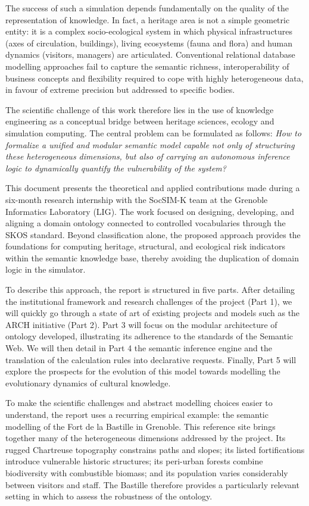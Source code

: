 \documentclass{article}
\begin{document}
The success of such a simulation depends fundamentally on the quality of the representation of knowledge. In fact, a heritage area is not a simple geometric entity: it is a complex socio-ecological system in which physical infrastructures (axes of circulation, buildings), living ecosystems (fauna and flora) and human dynamics (visitors, managers) are articulated. Conventional relational database modelling approaches fail to capture the semantic richness, interoperability of business concepts and flexibility required to cope with highly heterogeneous data, in favour of extreme precision but addressed to specific bodies.

The scientific challenge of this work therefore lies in the use of knowledge engineering as a conceptual bridge between heritage sciences, ecology and simulation computing. The central problem can be formulated as follows: \textit{How to formalize a unified and modular semantic model capable not only of structuring these heterogeneous dimensions, but also of carrying an autonomous inference logic to dynamically quantify the vulnerability of the system? }

This document presents the theoretical and applied contributions made during a six-month research internship with the SocSIM-K team at the Grenoble Informatics Laboratory (LIG). The work focused on designing, developing, and aligning a domain ontology connected to controlled vocabularies through the SKOS standard. Beyond classification alone, the proposed approach provides the foundations for computing heritage, structural, and ecological risk indicators within the semantic knowledge base, thereby avoiding the duplication of domain logic in the simulator.

To describe this approach, the report is structured in five parts. After detailing the institutional framework and research challenges of the project (Part 1), we will quickly go through a state of art of existing projects and models such as the ARCH initiative (Part 2). Part 3 will focus on the modular architecture of ontology developed, illustrating its adherence to the standards of the Semantic Web. We will then detail in Part 4 the semantic inference engine and the translation of the calculation rules into declarative requests. Finally, Part 5 will explore the prospects for the evolution of this model towards modelling the evolutionary dynamics of cultural knowledge.

To make the scientific challenges and abstract modelling choices easier to understand, the report uses a recurring empirical example: the semantic modelling of the Fort de la Bastille in Grenoble. This reference site brings together many of the heterogeneous dimensions addressed by the project. Its rugged Chartreuse topography constrains paths and slopes; its listed fortifications introduce vulnerable historic structures; its peri-urban forests combine biodiversity with combustible biomass; and its population varies considerably between visitors and staff. The Bastille therefore provides a particularly relevant setting in which to assess the robustness of the ontology.
\clearpage
\end{document}
